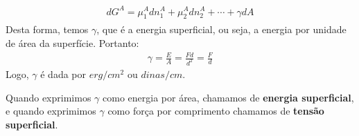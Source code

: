 \begin{multicols*}{2}
\begin{definition}
    \begin{gather}
      \begin{aligned}
        dG^{A} = \mu_1^{A} dn_1^{A} + \mu_2^{A} dn_2^{A} + \cdots + \gamma dA 
      \end{aligned}
    \end{gather}
    Desta forma, temos $\gamma$, que é a energia superficial, ou seja, a energia por unidade de área da superfície. Portanto:
    \begin{gather}
      \gamma = \frac{E}{A} = \frac{F d}{d^2} = \frac{F}{d}
    \end{gather}
    Logo, $\gamma$ é dada por $erg/cm^2$ ou $dinas/cm$. 
  \end{definition}
  \begin{remark}
    Quando exprimimos $\gamma$ como energia por área, chamamos de \textbf{energia superficial}, e quando exprimimos $\gamma$ como força por comprimento chamamos de \textbf{tensão superficial}.
  \end{remark}


\end{multicols*}

